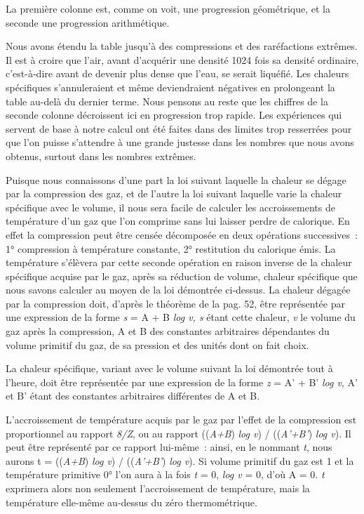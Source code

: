 \documentclass[french,twoside]{book} %
\begin{document}
\noindent La première colonne est, comme on voit, une progression géométrique, et la seconde une progression arithmétique.\par
Nous avons étendu la table jusqu’à des compressions et des raréfactions extrêmes. Il est à croire que l’air, avant d’acquérir une densité 1024 fois sa densité ordinaire, c’est-à-dire avant de devenir plus dense que l’eau, se serait liquéfié. Les chaleurs spécifiques s’annuleraient et même deviendraient négatives en prolongeant la table au-delà du dernier terme. Nous pensons au reste que les chiffres de la seconde colonne décroissent ici en progression trop rapide. Les expériences qui servent de base à notre calcul ont été faites dans des limites trop resserrées pour que l’on puisse s’attendre à une grande justesse dans les nombres que nous avons obtenus, surtout dans les nombres extrêmes.\par
Puisque nous connaissons d’une part la loi suivant laquelle la chaleur se dégage par la compression des gaz, et de l’autre la loi suivant laquelle varie la chaleur spécifique avec le volume, il nous sera facile de calculer les accroissements de température d’un gaz que l’on comprime sans lui laisser perdre de calorique. En effet la compression peut être censée décomposée en deux opérations successives : 1° compression à température constante, 2° restitution du calorique émis. La température s’élèvera par cette seconde opération en raison inverse de la chaleur spécifique acquise par le gaz, après sa réduction de volume, chaleur spécifique que nous savons calculer au moyen de la loi démontrée ci-dessus. La chaleur dégagée par la compression doit, d’après le théorème de la pag. 52, être représentée par une expression de la forme \emph{s} = A + B \emph{log v, s} étant cette chaleur, \emph{v} le volume du gaz après la compression, A et B des constantes arbitraires dépendantes du volume primitif du gaz, de sa pression et des unités dont on fait choix.\par
La chaleur spécifique, variant avec le volume suivant la loi démontrée tout à l’heure, doit être représentée par une expression de la forme \emph{z} = A’ + B’ \emph{log v}, A’ et B’ étant des constantes arbitraires différentes de A et B.\par
L’accroissement de température acquis par le gaz par l’effet de la compression est proportionnel au rapport \emph{8/Z}, ou au rapport ((\emph{A+B}) \emph{log v}) / ((\emph{A’+B’}) \emph{log v}). Il peut être représenté par ce rapport lui-même : ainsi, en le nommant \emph{t}, nous aurons t = ((\emph{A+B}) \emph{log v}) / ((\emph{A’+B’}) \emph{log v}). Si volume primitif du gaz est 1 et la température primitive 0° l’on aura à la fois \emph{t} = 0, \emph{log v} = 0, d’où A = 0. \emph{t} exprimera alors non seulement l’accroissement de température, mais la température elle-même au-dessus du zéro thermométrique.\par
\end{document}
